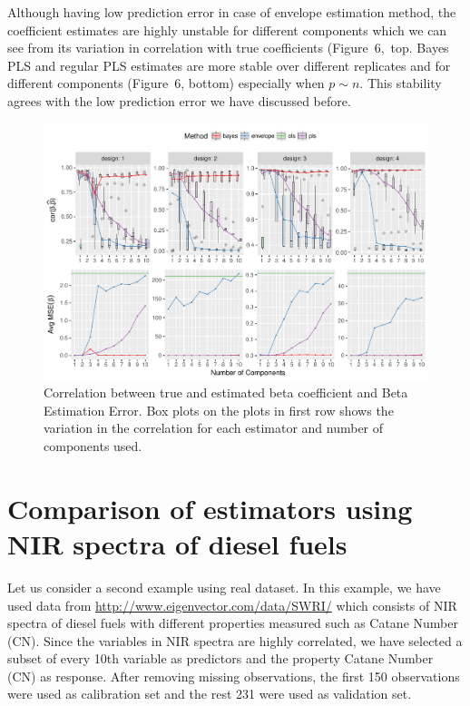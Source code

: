 \documentclass[num-refs]{wiley-article}
\begin{document}
Although having low prediction error in case of envelope estimation method, the coefficient estimates are highly unstable for different components which we can see from its variation in correlation with true coefficients (Figure~6,~top. Bayes PLS and regular PLS estimates are more stable over different replicates and for different components (Figure~6, bottom) especially when $p\sim n$. This stability agrees with the low prediction error we have discussed before.


\begin{figure}[!ht]
  \centering
  \includegraphics[width=\textwidth]{est-combined-plot.pdf}
  \caption{Correlation between true and estimated beta coefficient and Beta
    Estimation Error. Box plots on the plots in first row shows the variation in
  the correlation for each estimator and number of components used.}
  \label{fig:est-error-combined}
\end{figure}

\section{Comparison of estimators using NIR spectra of diesel fuels}

Let us consider a second example using real dataset. In this example, we have used data from \url{http://www.eigenvector.com/data/SWRI/} which consists of NIR spectra of diesel fuels with different properties measured such as Catane Number (CN). Since the variables in NIR spectra are highly correlated, we have selected a subset of every 10th variable as predictors and the property Catane Number (CN) as response. After removing missing observations, the first 150 observations were used as calibration set and the rest 231 were used as validation set.
\end{document}
